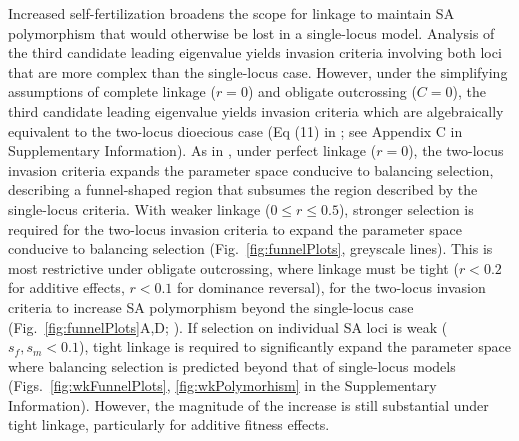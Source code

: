 \documentclass{article}
\begin{document}
Increased self-fertilization broadens the scope for linkage to maintain SA polymorphism that would otherwise be lost in a single-locus model. Analysis of the third candidate leading eigenvalue yields invasion criteria involving both loci that are more complex than the single-locus case. {\color{blue} However, under the simplifying assumptions of complete linkage ($r=0$) and obligate outcrossing ($C=0$), the third candidate leading eigenvalue yields invasion criteria which are algebraically equivalent to the two-locus dioecious case (Eq (11) in \citealt{Patten2010}; see Appendix C in Supplementary Information)}. As in \citet{Patten2010}, under perfect linkage ($r=0$), the two-locus invasion criteria expands the parameter space conducive to balancing selection, describing a funnel-shaped region that subsumes the region described by the single-locus criteria. With weaker linkage ($0 \leq r \leq 0.5$), stronger selection is required for the two-locus invasion criteria to expand the parameter space conducive to balancing selection (Fig.~\ref{fig:funnelPlots}, greyscale lines). This is most restrictive under obligate outcrossing, where linkage must be tight ($r < 0.2$ for additive effects, $r < 0.1$ for dominance reversal), for the two-locus invasion criteria to increase SA polymorphism beyond the single-locus case (Fig.~\ref{fig:funnelPlots}A,D; \citealt{Patten2010}). If selection on individual SA loci is weak ($s_f,s_m < 0.1$), tight linkage is required to significantly expand the parameter space where balancing selection is predicted beyond that of single-locus models (Figs.~\ref{fig:wkFunnelPlots}, \ref{fig:wkPolymorhism} in the Supplementary Information). However, the magnitude of the increase is still substantial under tight linkage, particularly for additive fitness effects.
\end{document}

